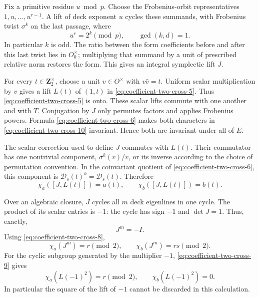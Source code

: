 Fix a primitive residue \(u\bmod p\). Choose the
Frobenius-orbit representatives
\(1,u,\ldots,u^{r-1}\). A lift of deck exponent
\(u\) cycles these summands, with Frobenius twist
\(\sigma^k\) on the last passage, where
\[
                  u^r=2^k\pmod p,
              \qquad \gcd(k,d)=1.
\]
In particular \(k\) is odd. The ratio between the
form coefficients before and after this last twist
lies in \(O_0^\times\); multiplying that summand by
a unit of prescribed relative norm restores the
form. This gives an integral symplectic lift \(J\).

For every \(t\in\mathbf Z_2^\times\), choose a unit
\(v\in O^\times\) with \(v\bar v=t\). Uniform scalar
multiplication by \(v\) gives a lift \(L(t)\) of
\((1,t)\) in \eqref{eq:coefficient-two-cross-5}. Thus \eqref{eq:coefficient-two-cross-5} is onto. These scalar
lifts commute with one another and with \(T\).
Conjugation by \(J\) only permutes factors and applies
Frobenius powers. Formula \eqref{eq:coefficient-two-cross-6} makes both characters
in \eqref{eq:coefficient-two-cross-10} invariant. Hence both are invariant under
all of \(E\).

The scalar correction used to define \(J\) commutes
with \(L(t)\). Their commutator has one nontrivial
component, \(\sigma^k(v)/v\), or its inverse according
to the choice of permutation convention. In the
coinvariant quotient of \eqref{eq:coefficient-two-cross-6}, this component is
\(\mathcal D_s(t)^k=\mathcal D_s(t)\). Therefore
\begin{equation}
             \chi_a([J,L(t)])=a(t),\qquad
             \chi_b([J,L(t)])=b(t).                       \label{eq:coefficient-two-cross-11}
\end{equation}

Over an algebraic closure, \(J\) cycles all \(m\)
deck eigenlines in one cycle. The product of its
scalar entries is \(-1\): the cycle has sign \(-1\)
and \(\det J=1\). Thus, exactly,
\begin{equation}
                             J^m=-I.                    \label{eq:coefficient-two-cross-12}
\end{equation}
Using \eqref{eq:coefficient-two-cross-8},
\begin{equation}
                    \chi_a(J^m)=r\pmod2,
           \qquad \chi_b(J^m)=rs\pmod2.
                                                        \label{eq:coefficient-two-cross-13}
\end{equation}
For the cyclic subgroup generated by the multiplier
\(-1\), \eqref{eq:coefficient-two-cross-9} gives
\begin{equation}
                   \chi_a(L(-1)^2)=r\pmod2,
              \qquad\chi_b(L(-1)^2)=0.                  \label{eq:coefficient-two-cross-14}
\end{equation}
In particular the square of the lift of \(-1\) cannot
be discarded in this calculation.

